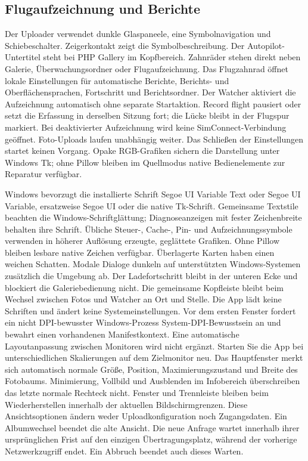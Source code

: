 \documentclass[11pt,a4paper]{article}
\begin{document}
\subsection{Flugaufzeichnung und Berichte}

Der Uploader verwendet dunkle Glaspaneele, eine Symbolnavigation und
Schiebeschalter. Zeigerkontakt zeigt die Symbolbeschreibung.
Der Autopilot-Untertitel steht bei PHP Gallery im Kopfbereich. Zahnräder
stehen direkt neben Galerie, Überwachungsordner oder Flugaufzeichnung.
Das Flugzahnrad öffnet lokale Einstellungen für automatische Berichte,
Berichts- und Oberflächensprachen, Fortschritt und Berichtsordner.
Der Watcher aktiviert die Aufzeichnung automatisch ohne separate Startaktion.
Record flight pausiert oder setzt die Erfassung in derselben Sitzung fort;
die Lücke bleibt in der Flugspur markiert. Bei deaktivierter Aufzeichnung
wird keine SimConnect-Verbindung geöffnet. Foto-Uploads laufen unabhängig
weiter. Das Schließen der Einstellungen startet keinen Vorgang. Opake
RGB-Grafiken sichern die Darstellung unter Windows Tk; ohne Pillow bleiben
im Quellmodus native Bedienelemente zur Reparatur verfügbar.

Windows bevorzugt die installierte Schrift Segoe UI Variable Text oder
Segoe UI Variable, ersatzweise Segoe UI oder die native Tk-Schrift. Gemeinsame Textstile
beachten die Windows-Schriftglättung; Diagnoseanzeigen mit fester
Zeichenbreite behalten ihre Schrift. Übliche Steuer-, Cache-, Pin- und
Aufzeichnungssymbole verwenden in höherer Auflösung erzeugte, geglättete
Grafiken. Ohne Pillow bleiben lesbare native Zeichen verfügbar. Überlagerte
Karten haben einen weichen Schatten. Modale Dialoge dunkeln auf unterstützten
Windows-Systemen zusätzlich die Umgebung ab. Der Ladefortschritt bleibt
in der unteren Ecke und blockiert die Galeriebedienung nicht. Die gemeinsame
Kopfleiste bleibt beim Wechsel zwischen Fotos und Watcher an Ort und Stelle.
Die App
lädt keine Schriften und ändert keine Systemeinstellungen. Vor dem ersten
Fenster fordert ein nicht DPI-bewusster Windows-Prozess System-DPI-Bewusstsein
an und bewahrt einen vorhandenen Manifestkontext. Eine automatische
Layoutanpassung zwischen Monitoren wird nicht ergänzt. Starten Sie die App
bei unterschiedlichen Skalierungen auf dem Zielmonitor neu.
Das Hauptfenster merkt sich automatisch normale Größe, Position,
Maximierungszustand und Breite des Fotobaums. Minimierung, Vollbild und
Ausblenden im Infobereich überschreiben das letzte normale Rechteck nicht.
Fenster und Trennleiste bleiben beim Wiederherstellen innerhalb der aktuellen
Bildschirmgrenzen. Diese Ansichtsoptionen ändern weder Uploadkonfiguration
noch Zugangsdaten.
Ein Albumwechsel beendet die alte Ansicht. Die neue Anfrage wartet innerhalb
ihrer ursprünglichen Frist auf den einzigen Übertragungsplatz, während der
vorherige Netzwerkzugriff endet. Ein Abbruch beendet auch dieses Warten.
\end{document}
